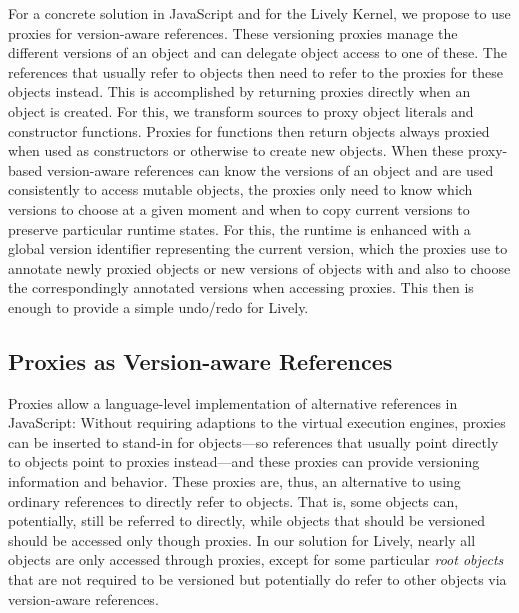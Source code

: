 For a concrete solution in JavaScript and for the Lively Kernel, we propose to use proxies for version-aware references.
These versioning proxies manage the different versions of an object and can delegate object access to one of these.
The references that usually refer to objects then need to refer to the proxies for these objects instead. 
This is accomplished by returning proxies directly when an object is created.
For this, we transform sources to proxy object literals and constructor functions.
Proxies for functions then return objects always proxied when used as constructors or otherwise to create new objects.
When these proxy-based version-aware references can know the versions of an object and are used consistently to access mutable objects, the proxies only need to know which versions to choose at a given moment and when to copy current versions to preserve particular runtime states.
For this, the runtime is enhanced with a global version identifier representing the current version, which the proxies use to annotate newly proxied objects or new versions of objects with and also to choose the correspondingly annotated versions when accessing proxies.
This then is enough to provide a simple undo/redo for Lively.


\subsection{Proxies as Version-aware References}

Proxies allow a language-level implementation of alternative references in JavaScript:
Without requiring adaptions to the virtual execution engines, proxies can be inserted to stand-in for objects---so references that usually point directly to objects point to proxies instead---and these proxies can provide versioning information and behavior.
These proxies are, thus, an alternative to using ordinary references to directly refer to objects.
That is, some objects can, potentially, still be referred to directly, while objects that should be versioned should be accessed only though proxies.
In our solution for Lively, nearly all objects are only accessed through proxies, except for some particular \emph{root objects} that are not required to be versioned but potentially do refer to other objects via version-aware references.

